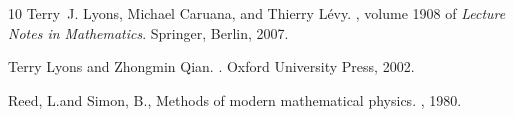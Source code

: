 \documentclass[11pt,a4paper]{amsart}
\numberwithin{equation}{section} %
\begin{document}
\begin{thebibliography}{10}
Terry~J. Lyons, Michael Caruana, and Thierry L{\'e}vy.
, volume 1908 of
  {\em {Lecture Notes in Mathematics}}.
\newblock Springer, Berlin, 2007.

Terry Lyons and Zhongmin Qian.
.
\newblock Oxford University Press, 2002.




Reed, L.and Simon, B.,
\newblock Methods of modern mathematical physics.
, 1980.



\end{thebibliography}
\end{document}

